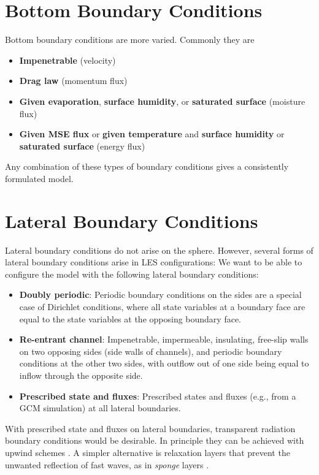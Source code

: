 \documentclass{report}
\begin{document}
\section{Bottom Boundary Conditions} \label{s:bottom_bc}

Bottom boundary conditions are more varied. Commonly they are
\begin{itemize}
    \item \textbf{Impenetrable} (velocity)
    \item \textbf{Drag law} (momentum flux)
    \item \textbf{Given evaporation}, \textbf{surface humidity}, or \textbf{saturated surface} (moisture flux)
    \item \textbf{Given MSE flux} or \textbf{given temperature} and \textbf{surface humidity} or \textbf{saturated surface} (energy flux)
\end{itemize}
Any combination of these types of boundary conditions gives a consistently formulated model.

\section{Lateral Boundary Conditions}

Lateral boundary conditions do not arise on the sphere. However, several forms of lateral boundary conditions arise in LES configurations: We want to be able to configure the model with the following lateral boundary conditions:
\begin{itemize}
    \item \textbf{Doubly periodic}: Periodic boundary conditions on the sides are a special case of Dirichlet conditions, where all state variables at a boundary face are equal to the state variables at the opposing boundary face.
    \item \textbf{Re-entrant channel}: Impenetrable, impermeable, insulating, free-slip walls on two opposing sides (side walls of channels), and periodic boundary conditions at the other two sides, with outflow out of one side being equal to inflow through the opposite side. 
    \item \textbf{Prescribed state and fluxes}: Prescribed states and fluxes (e.g., from a GCM simulation) at all lateral boundaries. 
\end{itemize}
With prescribed state and fluxes on lateral boundaries, transparent radiation boundary conditions would be desirable. In principle they can be achieved with upwind schemes \citep{Davies14a}. A simpler alternative is relaxation layers that prevent the unwanted reflection of fast waves, as in \textit{sponge} layers \citep{Davies76a}.
\end{document}
